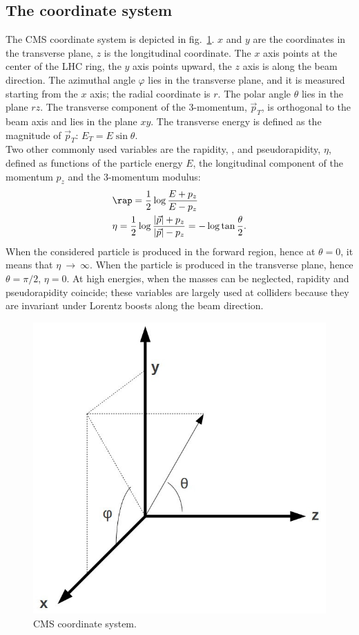 \subsection{The coordinate system}
\label{ssec:coord_syst}
The CMS coordinate system is depicted in fig.~\ref{fig:CMS_CoordSys}. $x$ and $y$ are the coordinates in the transverse plane, $z$ is the longitudinal coordinate. The $x$ axis points at the center of the LHC ring, the $y$ axis points upward, the $z$ axis is along the beam direction. The azimuthal angle $\varphi$ lies in the transverse plane, and it is measured starting from the $x$ axis; the radial coordinate is $r$. The polar angle $\theta$ lies in the plane $rz$. The transverse component of the 3-momentum, $\vec{p}_T$, is orthogonal to the beam axis and lies in the plane $xy$. The transverse energy is defined as the magnitude of $\vec{p}_T$: $E_T = E \sin{\theta}$.\\
Two other commonly used variables are the rapidity, \rap, and pseudorapidity, $\eta$, defined as functions of the particle energy $E$, the longitudinal component of the momentum $p_z$ and the 3-momentum modulus:
\begin{equation}
\begin{split}
 & \rap = \frac{1}{2} \log{\frac{E + p_z}{E - p_z}}\\
 & \eta = \frac{1}{2} \log{\frac{|\vec{p}| + p_z}{|\vec{p}| - p_z}} = -\log{\tan{\frac{\theta}{2}}}.
\end{split}
\end{equation}
When the considered particle is produced in the forward region, hence at $\theta = 0$, it means that $\eta~\rightarrow~\infty$. When the particle is produced in the transverse plane, hence $\theta = \pi /2$, $\eta = 0$. At high energies, when the masses can be neglected, rapidity and pseudorapidity coincide; these variables are largely used at colliders because they are invariant under Lorentz boosts along the beam direction.

\begin{figure}[!htb]
  \centering
    \includegraphics[width=.25\textwidth]{figures/CMS_CoordSys.jpg}
  \caption{CMS coordinate system.}
  \label{fig:CMS_CoordSys}
\end{figure}

